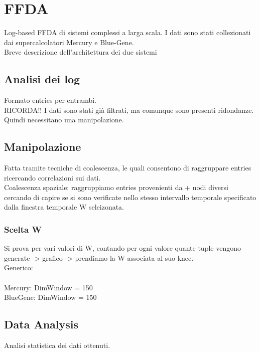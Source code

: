 \chapter{FFDA}
Log-based FFDA di sistemi complessi a larga scala. I dati sono stati collezionati dai supercalcolatori Mercury e Blue-Gene. 
\\Breve descrizione dell'architettura dei due sistemi
\section{Analisi dei log}
Formato entries per entrambi.
\\RICORDA!! I dati sono stati già filtrati, ma comunque sono presenti ridondanze. Quindi necessitano una manipolazione.
\section{Manipolazione}
Fatta tramite tecniche di coalescenza, le quali consentono di raggruppare entries ricercando correlazioni sui dati. 
\\Coalescenza spaziale: raggruppiamo entries provenienti da + nodi diversi cercando di capire se si sono verificate nello stesso intervallo temporale specificato dalla finestra temporale W seleizonata.
\subsection{Scelta W}
Si prova per vari valori di W, contando per ogni valore quante tuple vengono generate -> grafico -> prendiamo la W associata al suo knee.
\\
Generico:
\\
\\Mercury: DimWindow = 150
\\BlueGene: DimWindow = 150
\section{Data Analysis}
Analisi statistica dei dati ottenuti.

